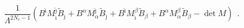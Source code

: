 \begin{equation}
  \frac{1}{\Lambda^{2N_c-1}}
  \left( B^{\hat \imath} M_{\hat\imath}^{\hat\jmath} \tilde{B}_{\hat\jmath}
    + B^\alpha M_\alpha^{\hat \jmath} \tilde{B}_{\hat \jmath}
    + B^{\hat \imath} M_{\hat \imath}^{\beta} \tilde{B}_{ \beta}
    + B^\alpha M_{\alpha}^{\beta} \tilde{B}_{\beta}
    - \det M
    \right)~~.
\label{wdyn}
\end{equation}

